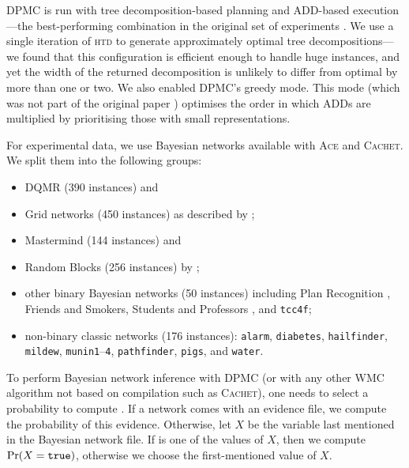 \textsc{DPMC} is run with tree decomposition-based planning and ADD-based
execution---the best-performing combination in the original set of experiments
\citep{DBLP:conf/cp/DudekPV20}. We use a single iteration of \textsc{htd}
\citep{DBLP:conf/cpaior/AbseherMW17} to generate approximately optimal tree
decompositions---we found that this configuration is efficient enough to handle
huge instances, and yet the width of the returned decomposition is unlikely to
differ from optimal by more than one or two. We also enabled \textsc{DPMC}'s
greedy mode. This mode (which was not part of the original paper
\citep{DBLP:conf/cp/DudekPV20}) optimises the order in which ADDs are multiplied
by prioritising those with small representations.

For experimental data, we use Bayesian networks available with \textsc{Ace} and
\textsc{Cachet}. We split them into the following groups:
\begin{itemize}
\item DQMR (390 instances) and
\item Grid networks (450 instances) as described by \citet{DBLP:conf/aaai/SangBK05};
\item Mastermind (144 instances) and
\item Random Blocks (256 instances) by \citet{DBLP:journals/ijar/ChaviraDJ06};
\item other binary Bayesian networks (50 instances) including Plan Recognition
  \citep{DBLP:conf/aaai/SangBK05}, Friends and Smokers, Students and Professors
  \citep{DBLP:journals/ijar/ChaviraDJ06}, and \texttt{tcc4f};
\item non-binary classic networks (176 instances): \texttt{alarm},
  \texttt{diabetes}, \texttt{hailfinder}, \texttt{mildew},
  \texttt{munin1}--\texttt{4}, \texttt{pathfinder}, \texttt{pigs}, and
  \texttt{water}.
\end{itemize}

To perform Bayesian network inference with \textsc{DPMC} (or with any other WMC
algorithm not based on compilation such as \textsc{Cachet}), one needs to select
a probability to compute
\citep{DBLP:conf/cp/DudekPV20,DBLP:conf/sat/SangBBKP04}. If a network comes with
an evidence file, we compute the probability of this evidence. Otherwise, let
$X$ be the variable last mentioned in the Bayesian network file. If \true{} is
one of the values of $X$, then we compute $\Pr(X = \texttt{true}{})$, otherwise we
choose the first-mentioned value of $X$.


